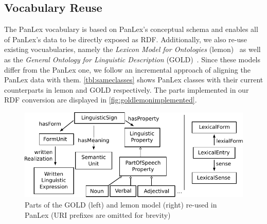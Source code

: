 \documentclass[sw]{iosart2c}
\begin{document}
\subsection{Vocabulary Reuse}
\label{sec:vocabulary-reuse}
The PanLex vocabulary is based on PanLex's conceptual schema and
enables all of PanLex's data to be directly exposed as RDF.
Additionally, we also re-use existing vocuabularies, namely
the \emph{Lexicon Model for Ontologies} (lemon)~\cite{lemon2011} as well as the \emph{General Ontology for Linguistic Description} (GOLD)~\cite{farr2003}.
Since these models differ from the PanLex one, we follow an
incremental approach of aligning the PanLex data with them.
\autoref{tbl:sameclasses} shows PanLex classes with their current counterparts
in lemon and GOLD respectively.
The parts implemented in our RDF conversion are displayed in \autoref{fig:goldlemonimplemented}.
\begin{figure}
  \centering
  \includegraphics[width=\linewidth]{images/pdf/gold_lemon_implemented.pdf}
  \caption{Parts of the GOLD (left) and lemon model (right) re-used in PanLex (URI prefixes are omitted for brevity)}
  \label{fig:goldlemonimplemented}
\end{figure}
\end{document}
